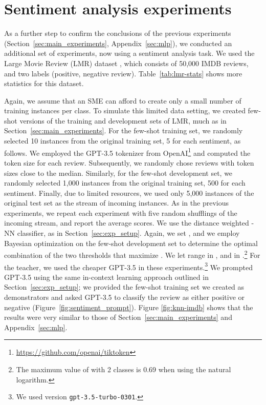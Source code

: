 \documentclass[11pt]{article}
\begin{document}
\section{Sentiment analysis experiments}
\label{sec:sentiment}

As a further step to confirm the conclusions of the previous experiments (Section~\ref{sec:main_experiments}, Appendix~\ref{sec:mlp}), 
we conducted an additional set of experiments, now using a sentiment analysis task.
We used the Large Movie Review (LMR) dataset \cite{maas-EtAl:2011:ACL-HLT2011}, which consists of 50,000 IMDB reviews, and two labels (positive, negative review). Table~\ref{tab:lmr-stats} shows more statistics for this dataset.

Again, we assume that an SME can afford to create only a small number of training instances per class. To simulate this limited data setting, we created few-shot versions of the training and development sets of LMR, much as in Section~\ref{sec:main_experiments}. For the few-shot training set, we randomly selected 10 instances from the original training set, 5 for each sentiment, as follows. We employed the GPT-3.5 tokenizer from OpenAI\footnote{\url{https://github.com/openai/tiktoken}} and computed the token size for each review. Subsequently, we randomly chose reviews with token sizes close to the median. Similarly, for the few-shot development set, we randomly selected 1,000 instances from the original training set, 500 for each sentiment. Finally, due to limited resources, we used only 5,000 instances of the original test set as the stream of incoming instances. As in the previous experiments, we repeat each experiment with five random shufflings of the incoming stream, and report the average scores. We use the distance weighted -NN classifier, as in Section~\ref{sec:exp_setup}. Again, we set , and we employ Bayesian optimization on the few-shot development set to determine the optimal combination of the two thresholds that maximize . We let  range in , and  in .\footnote{The maximum  value of  with 2 classes is 0.69 when using the natural logarithm.} For the teacher, we used the cheaper GPT-3.5 in these experiments.\footnote{We used version \texttt{gpt-3.5-turbo-0301}.} We prompted GPT-3.5 using the same in-context learning approach outlined in Section~\ref{sec:exp_setup}; we provided the few-shot training set we created as demonstrators and asked GPT-3.5 to classify the review as either positive or negative (Figure~\ref{fig:sentiment_prompt}). Figure \ref{fig:knn-imdb} shows that the results were very similar to those of Section~\ref{sec:main_experiments} and Appendix~\ref{sec:mlp}.
\end{document}
